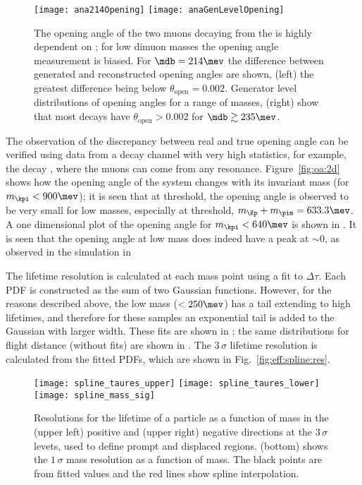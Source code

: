 \begin{figure}
  \begin{center}
    \texttt{[image: ana214Opening]}
    \texttt{[image: anaGenLevelOpening]}
  \end{center}
  \caption{\small
    The opening angle of the two muons decaying from the \db is highly dependent on \mdb; for low
    dimuon masses the opening angle measurement is biased.
    For $\mdb=214\mev$ the difference between generated and reconstructed opening angles are shown,
    (left) the greatest difference being below $\theta_\mathrm{open}=0.002$.
    Generator level distributions of opening angles for a range of masses,
    (right) show that most \db decays have $\theta_\mathrm{open}>0.002$ for
    $\mdb\gtrsim235\mev$.
  }
  \label{fig:opening:gen}
\end{figure}

The observation of the discrepancy between real and true opening angle can be verified using data
from a decay channel with very high statistics, for example,
the decay \decay{\Bd}{\kpi\mumu}, where the muons can come from any resonance.
Figure~\ref{fig:oa:2d} shows how the opening angle of the \kpi system changes with its invariant
mass (for $m_{\kpi}<900\mev$); it is seen that at threshold, the opening angle is observed to be
very small for low masses, especially at threshold, $m_{\Kp} + m_{\pim} = 633.3\mev$.
A one dimensional plot of the opening angle for $m_{\kpi}<640\mev$ is shown in .
It is seen that the \kpi opening angle at low mass does indeed have a peak at $\sim\!0$, as
observed in the simulation in 

The lifetime resolution is calculated at each mass point using a fit to $\Delta\tau$.
Each PDF is constructed as the sum of two Gaussian functions.
However, for the reasons described above, the low mass ($<250\mev$) has a tail extending to high
lifetimes, and therefore for these samples an exponential tail is added to the Gaussian with larger
width.
These fits are shown in ; the same distributions for flight distance (without
fits) are shown in .
The $3\,\sigma$ lifetime resolution is calculated from the fitted PDFs, which are
shown in Fig.~\ref{fig:eff:spline:res}.

\begin{figure}
  \begin{center}
    \texttt{[image: spline\_taures\_upper]}
    \texttt{[image: spline\_taures\_lower]}\\
    \texttt{[image: spline\_mass\_sig]}
    \caption{
      Resolutions for the lifetime of a particle as a function of mass in the
      (upper left) positive and
      (upper right) negative directions at the $3\,\sigma$ levets, used to
      define prompt and displaced regions.
      (bottom) shows the $1\,\sigma$ mass resolution as a function of
      mass.
      The black points are from fitted values and the red lines show spline interpolation.
    }
    \label{fig:eff:res}
  \end{center}
\end{figure}




